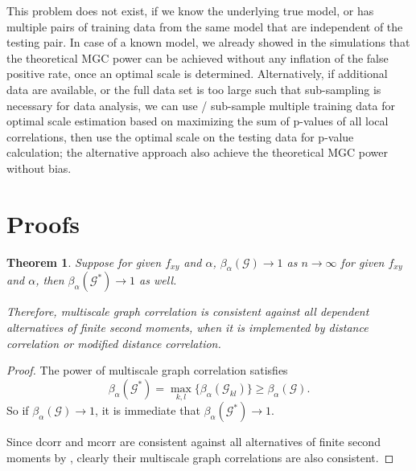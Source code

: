 \documentclass[11pt]{article}
\newcommand{\G}{\mathcal{G}}
\newtheorem{appThm}{Theorem}
\begin{document}
This problem does not exist, if we know the underlying true model, or has multiple pairs of training data from the same model that are independent of the testing pair. In case of a known model, we already showed in the simulations that the theoretical MGC power can be achieved without any inflation of the false positive rate, once an optimal scale is determined. Alternatively, if additional data are available, or the full data set is too large such that sub-sampling is necessary for data analysis, we can use / sub-sample multiple training data for optimal scale estimation based on maximizing the sum of p-values of all local correlations, then use the optimal scale on the testing data for p-value calculation; the alternative approach also achieve the theoretical MGC power without bias.

\section{Proofs}
\label{appen:proofs}
\begin{appThm}
Suppose for given $f_{xy}$ and $\alpha$, $\beta_{\alpha}(\G) \rightarrow 1$ as $n \rightarrow \infty$ for given $f_{xy}$ and $\alpha$, then $\beta_{\alpha}(\G^{*}) \rightarrow 1$ as well.

Therefore, multiscale graph correlation is consistent against all dependent alternatives of finite second moments, when it is implemented by distance correlation or modified distance correlation.
\end{appThm}
\begin{proof}
The power of multiscale graph correlation satisfies
\begin{equation}
\beta_{\alpha}(\G^{*})=\max_{k,l}\{\beta_{\alpha}(\G_{kl})\} \geq \beta_{\alpha}(\G).
\end{equation}
So if $\beta_{\alpha}(\G) \rightarrow 1$, it is immediate that $\beta_{\alpha}(\G^{*}) \rightarrow 1$.

Since dcorr and mcorr are consistent against all alternatives of finite second moments by \cite{SzekelyRizzoBakirov2007, SzekelyRizzo2013a}, clearly their multiscale graph correlations are also consistent.
\end{proof}
\end{document}
